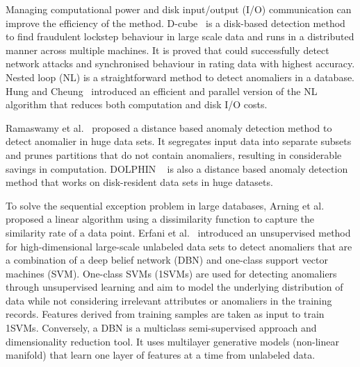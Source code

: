 Managing computational power and disk input/output (I/O) communication can
improve the efficiency of the method.
D-cube~\cite{shin2017d} is a disk-based detection method to
find fraudulent lockstep behaviour in large scale data and
runs in a distributed manner across multiple machines.
It is proved that could successfully
detect network attacks and
synchronised behaviour in rating data
with highest accuracy.
Nested loop (NL)\cite{knox1998algorithms} is
a straightforward method to detect anomaliers in a database.
Hung and Cheung~\cite{hung2002parallel} introduced an
efficient and parallel version
of the NL algorithm that reduces both computation and disk I/O costs.

Ramaswamy et al.~\cite{ramaswamy2000efficient} proposed a
distance based  anomaly detection method to detect anomalier in huge data sets.
It segregates input data into
separate subsets and prunes partitions that
do not contain anomaliers,
resulting in considerable
savings in computation.
DOLPHIN ~\cite{angiulli2007very} is also a
distance based anomaly detection method
that works on disk-resident data sets in huge datasets.

To solve the sequential exception problem in large databases,
Arning et al.~\cite{arning1996linear} proposed a linear algorithm
using a dissimilarity function to capture the
similarity rate of a data point.
Erfani et al.~\cite{erfani2016high} introduced
an unsupervised method for high-dimensional large-scale
unlabeled data sets to detect anomaliers that
are a combination of a deep belief network (DBN) and one-class
support vector machines (SVM).
One-class SVMs (1SVMs) are used for detecting anomaliers
through unsupervised learning and aim to
model the underlying distribution of data while
not considering irrelevant attributes or
anomaliers in the training records.
Features derived from training samples are taken as input to train 1SVMs.
Conversely,
a DBN is
a multiclass semi-supervised approach and dimensionality reduction tool.
It uses multilayer
generative models (non-linear manifold) that learn one layer of features at a time
from unlabeled data.


